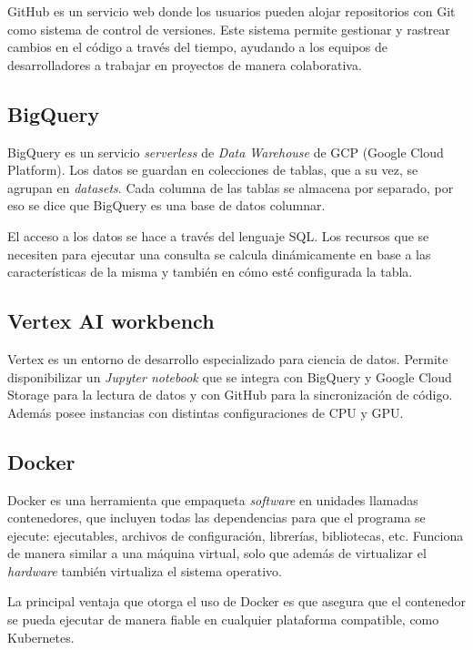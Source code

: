 GitHub es un servicio web donde los usuarios pueden alojar repositorios con Git como sistema de control de versiones. Este sistema permite gestionar y rastrear cambios en el código a través del tiempo, ayudando a los equipos de desarrolladores a trabajar en proyectos de manera colaborativa.

\subsection{BigQuery}

BigQuery es un servicio \textit{serverless} de \textit{Data Warehouse} de GCP (Google Cloud Platform). Los datos se guardan en colecciones de tablas, que a su vez, se agrupan en \textit{datasets}. Cada columna de las tablas se almacena por separado, por eso se dice que BigQuery es una base de datos columnar.

El acceso a los datos se hace a través del lenguaje SQL. Los recursos que se necesiten para ejecutar una consulta se calcula dinámicamente en base a las características de la misma y también en cómo esté configurada la tabla.

\subsection{Vertex AI workbench}

Vertex es un entorno de desarrollo especializado para ciencia de datos. Permite disponibilizar un \textit{Jupyter notebook} que se integra con BigQuery y Google Cloud Storage para la lectura de datos y con GitHub para la sincronización de código. Además posee instancias con distintas configuraciones de CPU y GPU. 

\subsection{Docker}

Docker es una herramienta que empaqueta \textit{software} en unidades llamadas contenedores, que incluyen todas las dependencias para que el programa se ejecute: ejecutables, archivos de configuración, librerías, bibliotecas, etc. Funciona de manera similar a una máquina virtual, solo que además de virtualizar el \textit{hardware} también virtualiza el sistema operativo.

La principal ventaja que otorga el uso de Docker es que asegura que el contenedor se pueda ejecutar de manera fiable en cualquier plataforma compatible, como Kubernetes.

